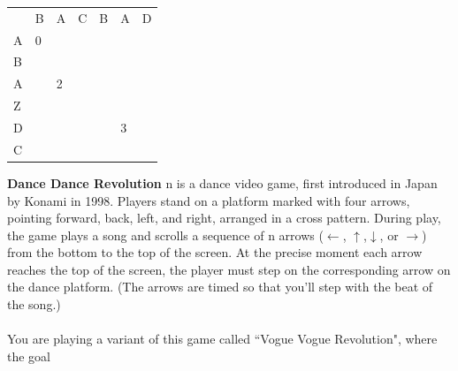 \documentclass[12pt]{article}
\begin{document}
\begin{table}[]
    \begin{tabular}{lllllll}
                           & B                      & A                      & C                     & B                     & A                      & D                     \\ \cline{2-7} 
    \multicolumn{1}{l|}{A} & \multicolumn{1}{l|}{0} & \multicolumn{1}{l|}{}  & \multicolumn{1}{l|}{} & \multicolumn{1}{l|}{} & \multicolumn{1}{l|}{}  & \multicolumn{1}{l|}{} \\ \cline{2-7} 
    \multicolumn{1}{l|}{B} & \multicolumn{1}{l|}{}  & \multicolumn{1}{l|}{}  & \multicolumn{1}{l|}{} & \multicolumn{1}{l|}{} & \multicolumn{1}{l|}{}  & \multicolumn{1}{l|}{} \\ \cline{2-7} 
    \multicolumn{1}{l|}{A} & \multicolumn{1}{l|}{}  & \multicolumn{1}{l|}{2} & \multicolumn{1}{l|}{} & \multicolumn{1}{l|}{} & \multicolumn{1}{l|}{}  & \multicolumn{1}{l|}{} \\ \cline{2-7} 
    \multicolumn{1}{l|}{Z} & \multicolumn{1}{l|}{}  & \multicolumn{1}{l|}{}  & \multicolumn{1}{l|}{} & \multicolumn{1}{l|}{} & \multicolumn{1}{l|}{}  & \multicolumn{1}{l|}{} \\ \cline{2-7} 
    \multicolumn{1}{l|}{D} & \multicolumn{1}{l|}{}  & \multicolumn{1}{l|}{}  & \multicolumn{1}{l|}{} & \multicolumn{1}{l|}{} & \multicolumn{1}{l|}{3} & \multicolumn{1}{l|}{} \\ \cline{2-7} 
    \multicolumn{1}{l|}{C} & \multicolumn{1}{l|}{}  & \multicolumn{1}{l|}{}  & \multicolumn{1}{l|}{} & \multicolumn{1}{l|}{} & \multicolumn{1}{l|}{}  & \multicolumn{1}{l|}{} \\ \cline{2-7} 
    \end{tabular}
    \end{table}
    \FloatBarrier
\noindent \textbf{Dance Dance Revolution} n is a dance video game, 
first introduced in Japan by Konami in
1998. Players stand on a platform marked 
with four arrows, pointing forward, back, left,
and right, arranged in a cross pattern. 
During play, the game plays a song and scrolls a
sequence of n arrows ($\leftarrow$, $\uparrow$,$\downarrow$, or $\rightarrow$) from the 
bottom to the top of the screen. At the
precise moment each arrow reaches the top of the 
screen, the player must step on the
corresponding arrow on the dance platform. (The 
arrows are timed so that you’ll step with
the beat of the song.)\\\\
You are playing a variant of this game called ``Vogue Vogue Revolution", where the goal
\end{document}
